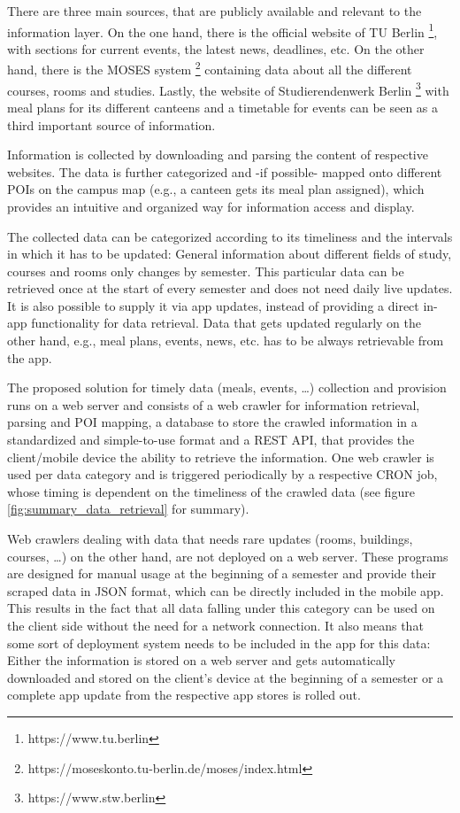 There are three main sources, that are publicly available and relevant to the information layer. On the one hand, there is the official website of TU Berlin \footnote{https://www.tu.berlin}, with sections for current events, the latest news, deadlines, etc. On the other hand, there is the MOSES system \footnote{https://moseskonto.tu-berlin.de/moses/index.html} containing data about all the different courses, rooms and studies. Lastly, the website of Studierendenwerk Berlin \footnote{https://www.stw.berlin} with meal plans for its different canteens and a timetable for events can be seen as a third important source of information.

Information is collected by downloading and parsing the content of respective websites. The data is further categorized and -if possible- mapped onto different POIs on the campus map (e.g., a canteen gets its meal plan assigned), which provides an intuitive and organized way for information access and display.

The collected data can be categorized according to its timeliness and the intervals in which it has to be updated: General information about different fields of study, courses and rooms only changes by semester. This particular data can be retrieved once at the start of every semester and does not need daily live updates. It is also possible to supply it via app updates, instead of providing a direct in-app functionality for data retrieval. Data that gets updated regularly on the other hand, e.g., meal plans, events, news, etc. has to be always retrievable from the app.

The proposed solution for timely data (meals, events, \ldots) collection and provision runs on a web server and consists of a web crawler for information retrieval, parsing and POI mapping, a database to store the crawled information in a standardized and simple-to-use format and a REST API, that provides the client/mobile device the ability to retrieve the information. One web crawler is used per data category and is triggered periodically by a respective CRON job, whose timing is dependent on the timeliness of the crawled data (see figure \ref{fig:summary_data_retrieval} for summary).

Web crawlers dealing with data that needs rare updates (rooms, buildings, courses, \ldots) on the other hand, are not deployed on a web server. These programs are designed for manual usage at the beginning of a semester and provide their scraped data in JSON format, which can be directly included in the mobile app. This results in the fact that all data falling under this category can be used on the client side without the need for a network connection. It also means that some sort of deployment system needs to be included in the app for this data: Either the information is stored on a web server and gets automatically downloaded and stored on the client's device at the beginning of a semester or a complete app update from the respective app stores is rolled out.

